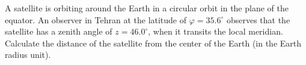 A satellite is orbiting around the Earth in a circular orbit in the plane of
the equator. An observer in Tehran at the latitude of $\varphi = 35.6^\circ$
observes that the satellite has a zenith angle of $z = 46.0^\circ$, when it
transits the local meridian. Calculate the distance of the satellite from the
center of the Earth (in the Earth radius unit).
